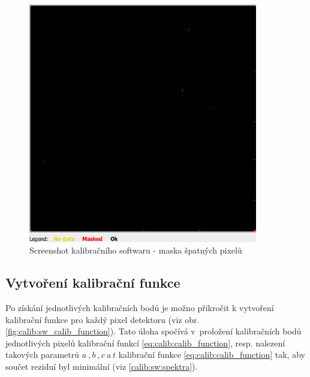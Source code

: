 \begin{figure}[th!]
	\begin{center}
		\includegraphics[width=10cm]{figures/calibsw_mask.png}
		\caption{Screenshot kalibračního softwaru - maska špatných pixelů}
		\label{fig:calib:sw_mask}
	\end{center}
\end{figure}

\newpage

\subsection{Vytvoření kalibrační funkce}
Po získání jednotlivých kalibračních bodů je možno přikročit k vytvoření kalibrační funkce pro každý pixel detektoru (viz obr. \ref{fig:calib:sw_calib_function}). Tato úloha spočívá v~proložení kalibračních bodů jednotlivých pixelů kalibrační funkcí \ref{eq:calib:calib_function}, resp. nalezení takových parametrů $a~,b~,c~\text{a}~t$ kalibrační funkce \ref{eq:calib:calib_function} tak, aby součet reziduí byl minimální (viz \ref{calib:sw:spektra}).

